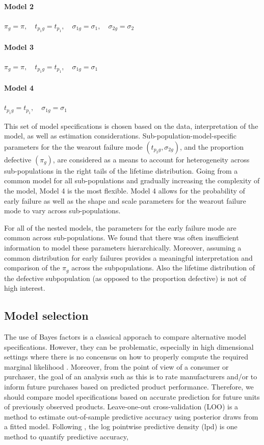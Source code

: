 \documentclass[11pt]{article}
\begin{document}
\paragraph{Model 2} $\pi_{g} = \pi,\quad t_{p_{1}g} = t_{p_1},\quad \sigma_{1g}=\sigma_1,\quad \sigma_{2g} = \sigma_2$
\paragraph{Model 3} $\pi_{g} = \pi,\quad  t_{p_{1}g}= t_{p_1},\quad \sigma_{1g}=\sigma_1$
\paragraph{Model 4} $t_{p_{1}g}= t_{p_1},\quad \sigma_{1g}=\sigma_1$


This set of model specifications is chosen based on the data, interpretation of the model, as well as estimation considerations.  Sub-population-model-specific parameters for the the wearout failure mode $(t_{p_{2}g},\sigma_{2g})$, and the proportion defective $(\pi_g)$, are considered as a means to account for heterogeneity across sub-populations in the right tails of the lifetime distribution.  Going from a common model for all sub-populations and gradually increasing the complexity of the model, Model 4 is the most flexible.  Model 4 allows for the probability of early failure as well as the shape and scale parameters for the wearout failure mode to vary across sub-populations.

For all of the nested models, the parameters for the early failure mode are common across sub-populations.  We found that there was often insufficient information to model these parameters hierarchically.  Moreover, assuming a common distribution for early failures provides a meaningful interpretation and comparison of the $\pi_g$ across the subpopulations.  Also the lifetime distribution of the defective subpopulation (as opposed to the proportion defective) is not of high interest.

\subsection{Model selection}
The use of Bayes factors is a classical apporach to compare alternative model specifications.  However, they can be problematic, especially in high dimensional settings where there is no concensus on how to properly compute the required marginal likelihood \citep{robert2016}. Moreover, from the point of view of a consumer or purchaser, the goal of an analysis such as this is to rate manufacturers and/or to inform future purchases based on predicted product performance. Therefore, we should compare model specifications based on accurate prediction for future units of previously observed products.  Leave-one-out cross-validation (LOO) is a method to estimate out-of-sample predictive accuracy using
posterior draws from a fitted model.  Following \cite{vehtari}, the log pointwise predictive density (lpd) is one method to quantify predictive accuracy,
\end{document}
